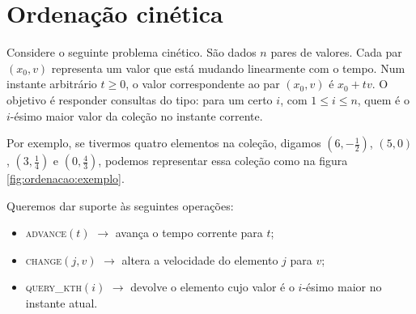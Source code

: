 
\chapter{Ordenação cinética}
Considere o seguinte problema cinético. São dados $n$ pares de
valores. Cada par $(x_0, v)$ representa um valor que está mudando
linearmente com o tempo. Num instante arbitrário $t \geq 0$, o valor
correspondente ao par $(x_0, v)$ é $x_0 + tv$. O objetivo é
responder consultas do tipo: para um certo $i$, com $1 \leq i \leq
n$, quem é o $i$-ésimo maior valor da coleção no instante corrente.

Por exemplo, se tivermos quatro elementos na coleção, digamos
$\left(6, -\frac{1}{2}\right)$, $(5, 0)$, $\left(3,
\frac{1}{4}\right)$ e $\left(0, \frac{4}{3}\right)$, podemos
representar essa coleção como na figura \ref{fig:ordenacao:exemplo}.



\newpage

Queremos dar suporte às seguintes operações:
\begin{itemize}
    \item \textsc{advance}$(t)$ $\rightarrow$ avança o tempo
    corrente para $t$;
    \item \textsc{change}$(j, v)$ $\rightarrow$ altera a
    velocidade do elemento $j$ para $v$;
    \item \textsc{query\_kth}$(i)$ $\rightarrow$ devolve o
    elemento cujo valor é o $i$-ésimo maior no instante atual.
\end{itemize}

